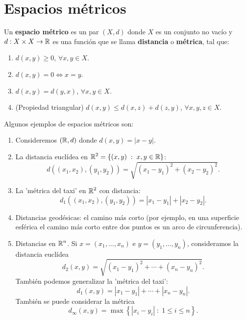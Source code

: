 \chapter{Espacios métricos}
\begin{definition}
Un \textbf{espacio métrico} es un par $\displaystyle \left(X, d\right) $ donde $\displaystyle X $ es un conjunto no vacío y $\displaystyle d : X \times X \to \mathbb{R} $ es una función que se llama \textbf{distancia} o \textbf{métrica}, tal que:
\begin{enumerate}
\item $\displaystyle d\left(x,y\right) \geq 0 $, $\displaystyle \forall x,y \in X $.
\item $\displaystyle d\left(x,y\right) = 0 \iff x = y $.
\item $\displaystyle d\left(x,y\right) = d\left(y,x\right) $, $\displaystyle \forall x,y \in X $.
\item (Propiedad triangular) $\displaystyle d\left(x,y\right) \leq d\left(x,z\right) + d\left(z,y\right) $, $\displaystyle \forall x,y,z \in X $.
\end{enumerate}
\end{definition}
\begin{eg} Algunos ejemplos de espacios métricos son:
\begin{enumerate}
\item Consideremos $\displaystyle \left(\mathbb{R}, d\right) $ donde $\displaystyle d\left(x,y\right) = \left|x - y\right| $.
\item La distancia euclídea en $\displaystyle \mathbb{R}^{2} = \left\{ \left(x,y\right) \; : \; x,y \in \mathbb{R}\right\} $: 
	\[ d\left(\left(x_{1}, x_{2}\right), \left(y_{1}, y_{2}\right)\right) = \sqrt{\left(x_{1}-y_{1}\right)^{2}+\left(x_{2}-y_{2}\right)^{2}}.\]
\item La 'métrica del taxi' en $\displaystyle \mathbb{R}^{2} $ con distancia:
	\[d _{1}\left(\left(x_{1}, x_{2}\right), \left(y_{1}, y_{2}\right)\right) = \left|x_{1} - y_{1}\right| + \left|x_{2}-y_{2}\right| .\]
\item Distancias geodésicas: el camino más corto (por ejemplo, en una superficie esférica el camino más corto entre dos puntos es un arco de circunferencia).
\item Distancias en $\displaystyle \mathbb{R}^{n} $. Si $\displaystyle x = \left(x_{1}, \ldots, x_{n}\right) $ e $\displaystyle y= \left(y_{1}, \ldots, y_{n}\right) $, consideramos la distancia euclídea
	\[d _{2}\left(x,y\right) = \sqrt{\left(x_{1}-y_{1}\right)^{2} + \cdots + \left(x_{n}-y_{n}\right)^{2}} .\]
También podemos generalizar la 'métrica del taxi':
\[ d _{1}\left(x,y\right) = \left|x_{1}-y_{1}\right| + \cdots + \left|x_{n}-y_{n}\right| .\]
También se puede considerar la métrica
\[d _{\infty}\left(x,y\right) = \max \left\{  \left|x_{i}-y_{i}\right| \; : \; 1 \leq i \leq n\right\}  .\]
\end{enumerate}
\end{eg}
